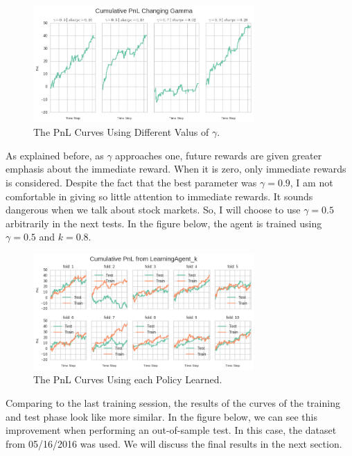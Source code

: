 \documentclass[a4paper]{article}
\begin{document}
\begin{figure}[ht]
\centering
\includegraphics[width=0.75\textwidth]{figures/optimize_gamma.png}
\caption{\label{fig:olicy_test_1}The PnL Curves Using Different Valus of $\gamma$.}
\end{figure}

As explained before, as $\gamma$ approaches one, future rewards are given greater emphasis about the immediate reward. When it is zero, only immediate rewards is considered. Despite the fact that the best parameter was $\gamma = 0.9$, I am not comfortable in giving so little attention to immediate rewards. It sounds dangerous when we talk about stock markets. So, I will choose to use $\gamma = 0.5$ arbitrarily in the next tests. In the figure below, the agent is trained using $\gamma=0.5$ and $k=0.8$.

\begin{figure}[ht]
\centering
\includegraphics[width=0.75\textwidth]{figures/policy_tests_2.png}
\caption{\label{fig:olicy_test_1}The PnL Curves Using each Policy Learned.}
\end{figure}

Comparing to the last training session, the results of the curves of the training and test phase look like more similar. In the figure below, we can see this improvement when performing an out-of-sample test. In this case, the dataset from 05/16/2016 was used. We will discuss the final results in the next section.
\end{document}
